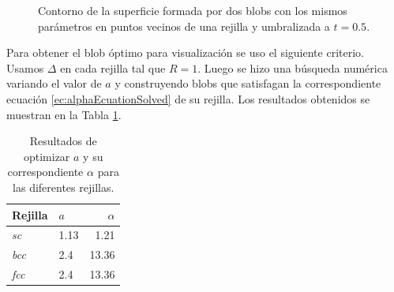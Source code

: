 \begin{figure}[htp]
\begin{center}
  \end{center}
  \caption[Contorno de la superficie formada por dos blobs con los mismos parámetros en puntos vecinos de una rejilla y umbralizada a $t = 0.5$]{Contorno de la superficie formada por dos blobs con los mismos parámetros en puntos vecinos de una rejilla y umbralizada a $t = 0.5$.}
  \label{fig:contornos}
\end{figure}

Para obtener el blob óptimo para visualización se uso el siguiente criterio. Usamos $\Delta$ en cada rejilla tal que $R = 1$. Luego se hizo una búsqueda numérica variando el valor de $a$ y construyendo blobs que satisfagan la correspondiente ecuación \eqref{ec:alphaEcuationSolved} de su rejilla. Los resultados obtenidos se muestran en la Tabla \ref{table:resultadosBlobs}.


\begin{table}
\begin{center}
  \begin{tabular}{| l | l | r |}
    \hline
    Rejilla & $a$ & $\alpha$ \\ 
    \hline
    \emph{sc} & 1.13 &  1.21 \\
    \emph{bcc} & 2.4 & 13.36 \\
    \emph{fcc} & 2.4 & 13.36 \\
    \hline
  \end{tabular}
\end{center}
\caption[Resultados de optimizar $a$ y su correspondiente $\alpha$ para las diferentes rejillas]{Resultados de optimizar $a$ y su correspondiente $\alpha$ para las diferentes rejillas.}
\label{table:resultadosBlobs}
\end{table}


